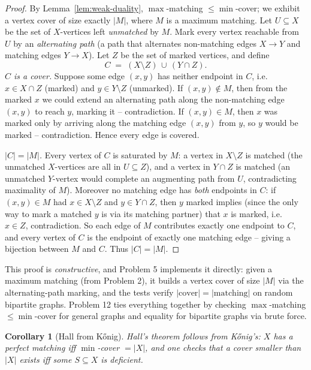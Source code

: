 \documentclass[11pt]{article}
\newtheorem{corollary}[theorem]{Corollary}
\begin{document}
\begin{proof}
By Lemma~\ref{lem:weak-duality}, $\max$-matching $\le \min$-cover; we exhibit a
vertex cover of size exactly $|M|$, where $M$ is a maximum matching. Let
$U \subseteq X$ be the set of $X$-vertices left \emph{unmatched} by $M$. Mark
every vertex reachable from $U$ by an \emph{alternating path} (a path that
alternates non-matching edges $X \to Y$ and matching edges $Y \to X$). Let
$Z$ be the set of marked vertices, and define
\[
   C \;=\; (X \setminus Z) \,\cup\, (Y \cap Z).
\]
\emph{$C$ is a cover.} Suppose some edge $(x,y)$ has neither endpoint in $C$,
i.e.\ $x \in X \cap Z$ (marked) and $y \in Y \setminus Z$ (unmarked). If $(x,y)
\notin M$, then from the marked $x$ we could extend an alternating path along the
non-matching edge $(x,y)$ to reach $y$, marking it -- contradiction. If $(x,y)
\in M$, then $x$ was marked only by arriving along the matching edge $(x,y)$ from
$y$, so $y$ would be marked -- contradiction. Hence every edge is covered.

\emph{$|C| = |M|$.} Every vertex of $C$ is saturated by $M$: a vertex in
$X \setminus Z$ is matched (the unmatched $X$-vertices are all in $U \subseteq Z$),
and a vertex in $Y \cap Z$ is matched (an unmatched $Y$-vertex would complete an
augmenting path from $U$, contradicting maximality of $M$). Moreover no matching
edge has \emph{both} endpoints in $C$: if $(x,y) \in M$ had $x \in X\setminus Z$
and $y \in Y \cap Z$, then $y$ marked implies (since the only way to mark a
matched $y$ is via its matching partner) that $x$ is marked, i.e.\ $x \in Z$,
contradiction. So each edge of $M$ contributes exactly one endpoint to $C$, and
every vertex of $C$ is the endpoint of exactly one matching edge -- giving a
bijection between $M$ and $C$. Thus $|C| = |M|$.
\end{proof}

This proof is \emph{constructive}, and Problem 5 implements it directly: given a
maximum matching (from Problem 2), it builds a vertex cover of size $|M|$ via the
alternating-path marking, and the tests verify $|\text{cover}| = |\text{matching}|$
on random bipartite graphs. Problem 12 ties everything together by checking
$\max$-matching $\le \min$-cover for general graphs and equality for bipartite
graphs via brute force.

\begin{corollary}[Hall from K\H{o}nig]
Hall's theorem follows from K\H{o}nig's: $X$ has a perfect matching iff
$\min$-cover $= |X|$, and one checks that a cover smaller than $|X|$ exists iff
some $S \subseteq X$ is deficient.
\end{corollary}
\end{document}
